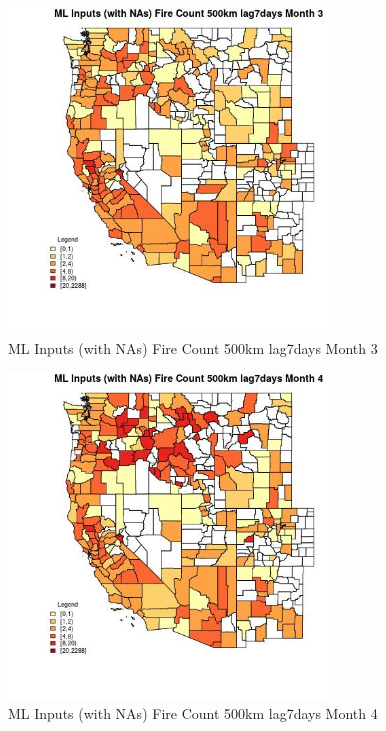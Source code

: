 \begin{figure} 
\centering  
\includegraphics[width=0.77\textwidth]{Code_Outputs/Report_ML_input_PM25_Step4_part_e_de_duplicated_aves_compiled_2019-05-20wNAs_CountyFire_Count_500km_lag7daysmedianMonth3.jpg} 
\caption{\label{fig:Report_ML_input_PM25_Step4_part_e_de_duplicated_aves_compiled_2019-05-20wNAsCountyFire_Count_500km_lag7daysmedianMonth3}ML Inputs (with NAs) Fire Count 500km lag7days Month 3} 
\end{figure} 
 

\begin{figure} 
\centering  
\includegraphics[width=0.77\textwidth]{Code_Outputs/Report_ML_input_PM25_Step4_part_e_de_duplicated_aves_compiled_2019-05-20wNAs_CountyFire_Count_500km_lag7daysmedianMonth4.jpg} 
\caption{\label{fig:Report_ML_input_PM25_Step4_part_e_de_duplicated_aves_compiled_2019-05-20wNAsCountyFire_Count_500km_lag7daysmedianMonth4}ML Inputs (with NAs) Fire Count 500km lag7days Month 4} 
\end{figure} 
 

